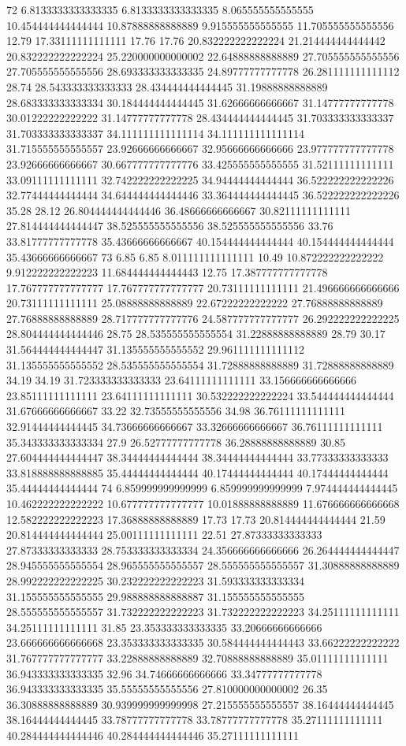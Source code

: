 72 6.8133333333333335 6.8133333333333335 8.065555555555555 10.454444444444444 10.87888888888889 9.915555555555555 11.705555555555556 12.79 17.33111111111111 17.76 17.76 20.832222222222224 21.214444444444442 20.832222222222224 25.220000000000002 22.64888888888889 27.705555555555556 27.705555555555556 28.693333333333335 24.89777777777778 26.281111111111112 28.74 28.543333333333333 28.434444444444445 31.19888888888889 28.683333333333334 30.184444444444445 31.62666666666667 31.14777777777778 30.01222222222222 31.14777777777778 28.434444444444445 31.703333333333337 31.703333333333337 34.111111111111114 34.111111111111114 31.715555555555557 23.92666666666667 32.95666666666666 23.977777777777778 23.92666666666667 30.667777777777776 33.425555555555555 31.52111111111111 33.09111111111111 32.742222222222225 34.94444444444444 36.522222222222226 32.77444444444444 34.644444444444446 33.364444444444445 36.522222222222226 35.28 28.12 26.804444444444446 36.48666666666667 30.82111111111111 27.814444444444447 38.525555555555556 38.525555555555556 33.76 33.81777777777778 35.43666666666667 40.154444444444444 40.154444444444444 35.43666666666667
73 6.85 6.85 8.011111111111111 10.49 10.872222222222222 9.912222222222223 11.684444444444443 12.75 17.387777777777778 17.767777777777777 17.767777777777777 20.73111111111111 21.496666666666666 20.73111111111111 25.08888888888889 22.67222222222222 27.76888888888889 27.76888888888889 28.717777777777776 24.587777777777777 26.292222222222225 28.804444444444446 28.75 28.535555555555554 31.22888888888889 28.79 30.17 31.564444444444447 31.135555555555552 29.961111111111112 31.135555555555552 28.535555555555554 31.72888888888889 31.72888888888889 34.19 34.19 31.723333333333333 23.64111111111111 33.156666666666666 23.85111111111111 23.64111111111111 30.532222222222224 33.544444444444444 31.67666666666667 33.22 32.73555555555556 34.98 36.76111111111111 32.91444444444445 34.73666666666667 33.32666666666667 36.76111111111111 35.343333333333334 27.9 26.52777777777778 36.28888888888889 30.85 27.604444444444447 38.34444444444444 38.34444444444444 33.77333333333333 33.818888888888885 35.44444444444444 40.17444444444444 40.17444444444444 35.44444444444444
74 6.859999999999999 6.859999999999999 7.974444444444445 10.462222222222222 10.677777777777777 10.01888888888889 11.676666666666668 12.582222222222223 17.36888888888889 17.73 17.73 20.814444444444444 21.59 20.814444444444444 25.00111111111111 22.51 27.87333333333333 27.87333333333333 28.753333333333334 24.356666666666666 26.264444444444447 28.945555555555554 28.965555555555557 28.555555555555557 31.30888888888889 28.992222222222225 30.232222222222223 31.593333333333334 31.155555555555555 29.988888888888887 31.155555555555555 28.555555555555557 31.732222222222223 31.732222222222223 34.25111111111111 34.25111111111111 31.85 23.353333333333335 33.20666666666666 23.666666666666668 23.353333333333335 30.584444444444443 33.66222222222222 31.767777777777777 33.22888888888889 32.70888888888889 35.01111111111111 36.943333333333335 32.96 34.74666666666666 33.34777777777778 36.943333333333335 35.55555555555556 27.810000000000002 26.35 36.30888888888889 30.939999999999998 27.215555555555557 38.16444444444445 38.16444444444445 33.78777777777778 33.78777777777778 35.27111111111111 40.284444444444446 40.284444444444446 35.27111111111111
